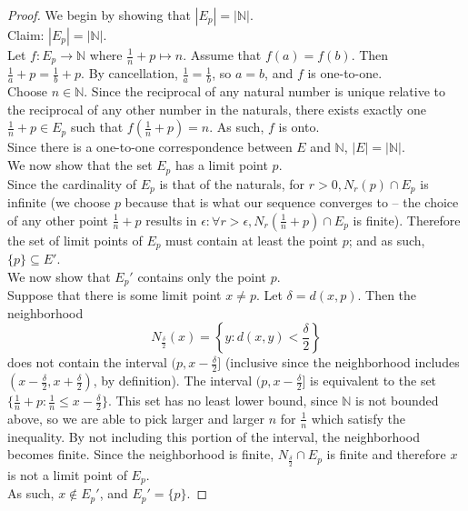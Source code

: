 \documentclass[10pt]{article}
\theoremstyle{definition}
\theoremstyle{plain}
\newcommand{\N}{\mathbb{N}}
\begin{document}
\begin{proof}
We begin by showing that $|E_p| = |\N|.$ \\

Claim: $|E_p|=|\N|$. \\

Let $f:E_p \rightarrow\N$ where $\frac{1}{n} + p \mapsto n$. Assume that $f(a)=f(b)$. Then $\frac{1}{a} + p =\frac{1}{b} + p$. By cancellation, $\frac{1}{a}=\frac{1}{b}$, so $a=b$, and $f$ is one-to-one. \\

Choose $n\in\N$. Since the reciprocal of any natural number is unique relative to the reciprocal of any other number in the naturals, there exists exactly one $\frac{1}{n} + p \in E_p$ such that $f(\frac{1}{n} + p) = n$. As such, $f$ is onto. \\

Since there is a one-to-one correspondence between $E$ and $\N$, $|E|=|\N|$. \\

We now show that the set $E_p$ has a limit point $p$. \\

Since the cardinality of $E_p$ is that of the naturals, for $r>0, N_r(p)\cap E_p$ is infinite (we choose $p$ because that is what our sequence converges to -- the choice of any other point $\frac{1}{n} + p$ results in $\epsilon: \forall r > \epsilon,
N_r(\frac{1}{n} + p)\cap E_p$ is finite). Therefore the set of limit points of $E_p$ must contain at least the point $p$; and as such, $\{p\}\subseteq E'$. \\

We now show that $E_p'$ contains only the point $p$. \\

Suppose that there is some limit point $x\neq p$. Let $\delta = d(x,p)$. Then the neighborhood 
$$N_\frac{\delta}{2} (x) = \left\{y: d(x,y) < \frac{\delta}{2}\right\}$$
does not contain the interval $(p, x -\frac{\delta}{2}]$ (inclusive since the neighborhood includes $(x -\frac{\delta}{2}, x +\frac{\delta}{2})$, by definition). The interval $(p, x -\frac{\delta}{2}]$ is equivalent to the set $\{\frac{1}{n} + p: \frac{1}{n} \leq x -\frac{\delta}{2}\}$. This set has no least lower bound, since $\N$ is not bounded above, so we are able to pick larger and larger $n$ for $\frac{1}{n}$ which satisfy the inequality. By not including this portion of the interval, the neighborhood becomes finite. Since the neighborhood is finite, $N_\frac{\delta}{2} \cap E_p$ is finite and therefore $x$ is not a limit point of $E_p$. \\

As such, $x\not\in E_p'$, and $E_p' = \{p\}$.
\end{proof}
\end{document}
